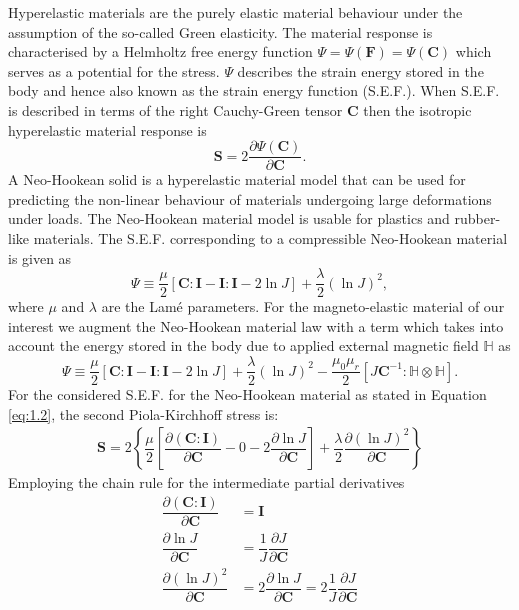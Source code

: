 \documentclass[11pt,a4paper,final]{article}
\begin{document}
Hyperelastic materials are the purely elastic material behaviour under the assumption of the so-called Green elasticity. The material response is characterised by a Helmholtz free energy function $\Psi = \Psi(\mathbf{F}) = \Psi(\mathbf{C}) $ which serves as a potential for the stress. $\Psi$ describes the strain energy stored in the body and hence also known as the strain energy function (S.E.F.). When S.E.F. is described in terms of the right Cauchy-Green tensor $\mathbf{C}$ then the isotropic hyperelastic material response is 
\begin{equation}
\mathbf{S} = 2 \dfrac{\partial \Psi (\mathbf{C})}{\partial \mathbf{C}}.
\end{equation}
A Neo-Hookean solid is a hyperelastic material model that can be used for predicting the non-linear behaviour of materials undergoing large deformations under loads. The Neo-Hookean material model is usable for plastics and rubber-like materials. The S.E.F. corresponding to a compressible Neo-Hookean material is given as
\begin{equation}
\Psi \equiv \dfrac{\mu}{2} [\mathbf{C} : \mathbf{I} - \mathbf{I} : \mathbf{I} - 2 \ln J] + \dfrac{\lambda}{2} (\ln J)^2,
\label{eq:1.2}
\end{equation}
where $\mu$ and $\lambda$ are the Lam\'e parameters. For the magneto-elastic material of our interest we augment the Neo-Hookean material law with a term which takes into account the energy stored in the body due to applied external magnetic field $\mathbb{H}$ as 
\begin{equation}
\Psi \equiv \dfrac{\mu}{2} [\mathbf{C} : \mathbf{I} - \mathbf{I} : \mathbf{I} - 2 \ln J] + \dfrac{\lambda}{2} (\ln J)^2 - \frac{\mu_0 \mu_r}{2} [J \mathbf{C}^{-1} : \mathbb{H} \otimes \mathbb{H}].
\end{equation}
For the considered S.E.F. for the Neo-Hookean material as stated in Equation \eqref{eq:1.2}, the second Piola-Kirchhoff stress is:
\begin{align}
\mathbf{S} = 2 \left\{ \dfrac{\mu}{2} \left[\dfrac{\partial (\mathbf{C} : \mathbf{I})}{\partial \mathbf{C}} - 0 - 2 \dfrac{\partial \ln J}{\partial \mathbf{C}}\right] + \dfrac{\lambda}{2} \dfrac{\partial (\ln J)^2}{\partial \mathbf{C}} \right\}
\end{align}
Employing the chain rule for the intermediate partial derivatives
\begin{align}
\dfrac{\partial (\mathbf{C} : \mathbf{I})}{\partial \mathbf{C}} &= \mathbf{I} \label{eq:1.4.1} \\ 
\dfrac{\partial \ln J}{\partial \mathbf{C}} &= \dfrac{1}{J} \dfrac{\partial J}{\partial \mathbf{C}} \label{eq:1.4.2} \\ 
\dfrac{\partial (\ln J)^2}{\partial \mathbf{C}} &= 2 \dfrac{\partial \ln J}{\partial \mathbf{C}} = 2 \dfrac{1}{J} \dfrac{\partial J}{\partial \mathbf{C}}
\label{eq:1.4.3}
\end{align}
\end{document}
